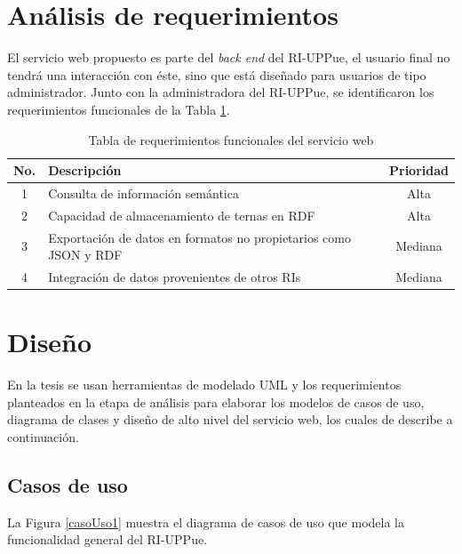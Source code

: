 \section{An\'alisis de requerimientos}

El servicio web propuesto es parte del \emph{back end} del RI-UPPue,  el usuario final no tendr\'a una interacci\'on con \'este, sino que est\'a dise\~{n}ado para usuarios de tipo administrador. Junto con la administradora del RI-UPPue, se identificaron los requerimientos funcionales de la Tabla \ref{tablaRequerimientos}. 

\begin{table}[htbp]
    \begin{center}
    \caption{Tabla de requerimientos funcionales del servicio web}

    \begin{tabular}{|c|l|c|}
    \hline
    \centering \textbf{No. } & \textbf{Descripci\'on} & \textbf{Prioridad} \\
    \hline \hline
    1 & Consulta de informaci\'on sem\'antica & Alta  \\ \hline
    2 & Capacidad de almacenamiento de ternas en RDF & Alta  \\ \hline
    3 & Exportaci\'on de datos en formatos no propietarios como JSON y RDF & Mediana  \\ \hline
    4 & Integraci\'on de datos provenientes de otros RIs & Mediana  \\ \hline
    \end{tabular}
    \label{tablaRequerimientos}
    \end{center}
\end{table}

\section{Dise\~{n}o}

En la tesis se usan herramientas de modelado UML y los requerimientos planteados en la etapa de an\'alisis para elaborar los modelos de casos de uso, diagrama de clases y dise\~{n}o de alto nivel del servicio web, los cuales de describe a continuaci\'on.


\subsection{Casos de uso}

La Figura \ref{casoUso1} muestra el diagrama de casos de uso que modela la funcionalidad general del RI-UPPue.

